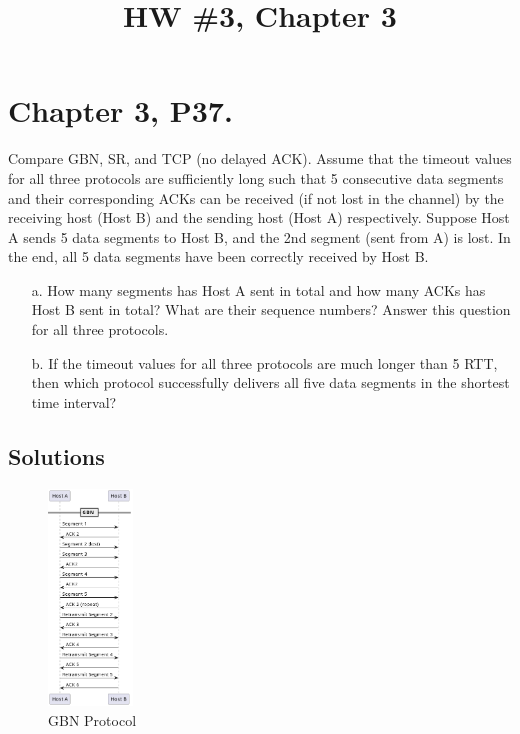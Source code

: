 \documentclass{cshwk}
\title{HW \#3, Chapter 3}
\begin{document}
\maketitle

\section*{Chapter 3, P37.}

Compare GBN, SR, and TCP (no delayed ACK). Assume that the timeout values for all three protocols are sufficiently long such that 5 consecutive data segments and their corresponding ACKs can be received (if not lost in the channel) by the receiving host (Host B) and the sending host (Host A) respectively. Suppose Host A sends 5 data segments to Host B, and the 2nd segment (sent from A) is lost. In the end, all 5 data segments have been correctly received by Host B.

\begin{enumerate}
    \item[a.] How many segments has Host A sent in total and how many ACKs has Host B sent in total? What are their sequence numbers? Answer this question for all three protocols.
    \item[b.] If the timeout values for all three protocols are much longer than 5 RTT, then which protocol successfully delivers all five data segments in the shortest time interval?
\end{enumerate}

\subsection*{Solutions}
\begin{figure}[htbp]
    \centering
    \includegraphics[width=0.2\textwidth]{hw3-4-1.png}
    \caption{GBN Protocol}
    \label{fig:gbn}
\end{figure}
\end{document}
